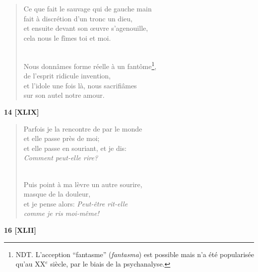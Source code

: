 \documentclass[a4paper,12pt]{book}
\begin{document}
\begin{verse}
Ce que fait le sauvage qui de gauche main \\
fait à discrétion d'un tronc un dieu, \\
et ensuite devant son {\oe}uvre s'agenouille, \\
cela nous le fîmes toi et moi. \\ \

Nous donnâmes forme réelle à un fantôme\footnote{NDT. L'acception ``fantasme'' ({\em fantasma}) est possible mais n'a été popularisée qu'au XX$^e$ siècle, par le biais de la psychanalyse.}, \\
de l'esprit ridicule invention, \\
et l'idole une fois là, nous sacrifiâmes \\
sur son autel notre amour. \\
\end{verse}


\begin{center} {\bf 14 [XLIX]} \end{center}

\begin{verse}
Parfois je la rencontre de par le monde \\
et elle passe près de moi; \\
et elle passe en souriant, et je dis: \\
{\em Comment peut-elle {\em rire\/}?} \\ \

Puis point à ma lèvre un autre sourire, \\
masque de la douleur, \\
et je pense alors: {\em Peut-être rit-elle \\
comme je ris moi-même!} \\
\end{verse}

\bigskip

\begin{center} {\bf 16 [XLII]} \end{center}
\end{document}
